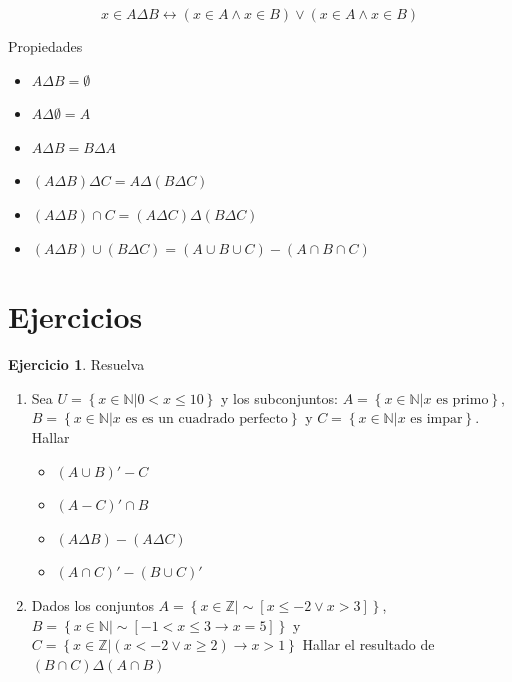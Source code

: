 \documentclass[
  16pt,
]{krantz}
\providecommand{\tightlist}{%
  \setlength{\itemsep}{0pt}\setlength{\parskip}{0pt}}
\theoremstyle{definition}
\theoremstyle{definition}
\theoremstyle{definition}
\newtheorem{exercise}{Ejercicio}[chapter]
\theoremstyle{definition}
\theoremstyle{remark}
\begin{document}
\[
x\in A\Delta B\leftrightarrow (x\in A\wedge x\in B)\vee (x\in A\wedge x\in B)
\]

Propiedades

\begin{itemize}
\tightlist
\item
  \(A\Delta B=\emptyset\)
\item
  \(A\Delta \emptyset=A\)
\item
  \(A\Delta B=B\Delta A\)
\item
  \((A\Delta B)\Delta C=A\Delta(B\Delta C)\)
\item
  \((A\Delta B)\cap C=(A\Delta C)\Delta(B\Delta C)\)
\item
  \((A\Delta B)\cup(B\Delta C)=(A\cup B\cup C)-(A\cap B\cap C)\)
\end{itemize}

\hypertarget{ejercicios}{%
\section{Ejercicios}\label{ejercicios}}

\begin{exercise}

Resuelva

\begin{enumerate}
\def\labelenumi{\arabic{enumi}.}
\tightlist
\item
  Sea \(U=\left\{x\in\mathbb{N}|0<x\leq 10\right\}\) y los subconjuntos: \(A=\left\{x\in\mathbb{N}|x \text{ es primo}\right\}\), \(B=\left\{x\in\mathbb{N}| x\text{ es es un cuadrado perfecto}\right\}\) y \(C=\left\{x\in\mathbb{N}|x\text{ es impar}\right\}\). Hallar

  \begin{itemize}
  \tightlist
  \item
    \((A\cup B)'-C\)
  \item
    \((A-C)'\cap B\)
  \item
    \((A\Delta B)-(A\Delta C)\)
  \item
    \((A\cap C)'-(B\cup C)'\)
  \end{itemize}
\item
  Dados los conjuntos \(A=\left\{x\in\mathbb{Z}|\sim[x\leq -2\vee x>3]\right\}\), \(B=\left\{x\in\mathbb{N}|\sim[-1<x\leq 3 \rightarrow x=5]\right\}\) y \(C=\left\{x\in\mathbb{Z}|(x< -2\vee x\geq 2)\rightarrow x>1\right\}\) Hallar el resultado de \((B\cap C)\Delta(A\cap B)\)
\end{enumerate}

\end{exercise}
\end{document}
